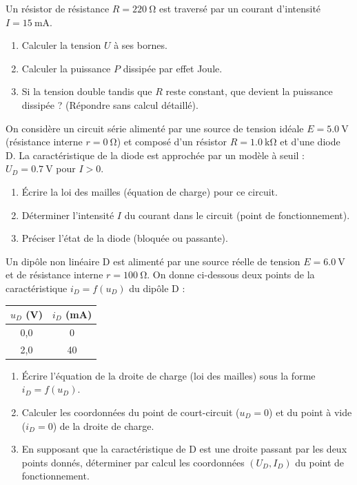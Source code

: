 \documentclass[11pt]{article}
\begin{document}
\begin{exercice}
Un résistor de résistance $R = \SI{220}{\ohm}$ est traversé par un courant d'intensité $I = \SI{15}{\milli\ampere}$.
\begin{enumerate}
    \item Calculer la tension $U$ à ses bornes.
    \item Calculer la puissance $P$ dissipée par effet Joule.
    \item Si la tension double tandis que $R$ reste constant, que devient la puissance dissipée ? (Répondre sans calcul détaillé).
\end{enumerate}
\end{exercice}

\begin{exercice}
On considère un circuit série alimenté par une source de tension idéale $E = \SI{5,0}{\volt}$ (résistance interne $r = \SI{0}{\ohm}$) et composé d'un résistor $R = \SI{1,0}{\kilo\ohm}$ et d'une diode D.
La caractéristique de la diode est approchée par un modèle à seuil : $U_D = \SI{0,7}{\volt}$ pour $I > 0$.
\begin{enumerate}
    \item Écrire la loi des mailles (équation de charge) pour ce circuit.
    \item Déterminer l'intensité $I$ du courant dans le circuit (point de fonctionnement).
    \item Préciser l'état de la diode (bloquée ou passante).
\end{enumerate}
\end{exercice}

\begin{exercice}
Un dipôle non linéaire D est alimenté par une source réelle de tension $E = \SI{6,0}{\volt}$ et de résistance interne $r = \SI{100}{\ohm}$.
On donne ci-dessous deux points de la caractéristique $i_D = f(u_D)$ du dipôle D :
\begin{center}
\begin{tabular}{|c|c|}
\hline
$u_D$ (\si{\volt}) & $i_D$ (\si{\milli\ampere}) \\ \hline
0,0 & 0 \\ \hline
2,0 & 40 \\ \hline
\end{tabular}
\end{center}
\begin{enumerate}
    \item Écrire l'équation de la droite de charge (loi des mailles) sous la forme $i_D = f(u_D)$.
    \item Calculer les coordonnées du point de court-circuit ($u_D=0$) et du point à vide ($i_D=0$) de la droite de charge.
    \item En supposant que la caractéristique de D est une droite passant par les deux points donnés, déterminer par calcul les coordonnées $(U_D, I_D)$ du point de fonctionnement.
\end{enumerate}
\end{exercice}
\end{document}
